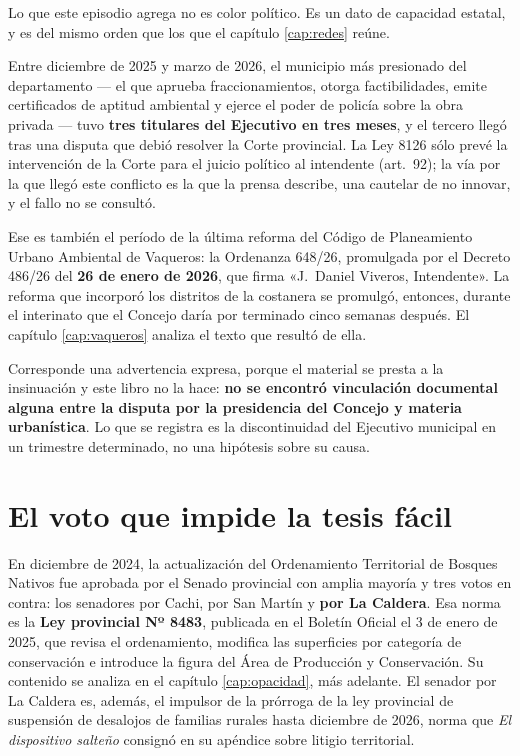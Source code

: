 \begin{cautela}
Lo que este episodio agrega no es color político. Es un dato de capacidad estatal, y es del mismo orden que los que el capítulo \ref{cap:redes} reúne.

Entre diciembre de 2025 y marzo de 2026, el municipio más presionado del departamento --- el que aprueba fraccionamientos, otorga factibilidades, emite certificados de aptitud ambiental y ejerce el poder de policía sobre la obra privada --- tuvo \textbf{tres titulares del Ejecutivo en tres meses}, y el tercero llegó tras una disputa que debió resolver la Corte provincial. La Ley 8126 sólo prevé la intervención de la Corte para el juicio político al intendente (art.\ 92); la vía por la que llegó este conflicto es la que la prensa describe, una cautelar de no innovar, y el fallo no se consultó.

Ese es también el período de la última reforma del Código de Planeamiento Urbano Ambiental de Vaqueros: la Ordenanza 648/26, promulgada por el Decreto 486/26 del \textbf{26 de enero de 2026}, que firma «J.\ Daniel Viveros, Intendente». La reforma que incorporó los distritos de la costanera se promulgó, entonces, durante el interinato que el Concejo daría por terminado cinco semanas después. El capítulo \ref{cap:vaqueros} analiza el texto que resultó de ella.

Corresponde una advertencia expresa, porque el material se presta a la insinuación y este libro no la hace: \textbf{no se encontró vinculación documental alguna entre la disputa por la presidencia del Concejo y materia urbanística}. Lo que se registra es la discontinuidad del Ejecutivo municipal en un trimestre determinado, no una hipótesis sobre su causa.
\end{cautela}


\section{El voto que impide la tesis fácil}

En diciembre de 2024, la actualización del Ordenamiento Territorial de Bosques Nativos fue aprobada por el Senado provincial con amplia mayoría y tres votos en contra: los senadores por Cachi, por San Martín y \textbf{por La Caldera}. Esa norma es la \textbf{Ley provincial Nº 8483}, publicada en el Boletín Oficial el 3 de enero de 2025, que revisa el ordenamiento, modifica las superficies por categoría de conservación e introduce la figura del Área de Producción y Conservación. Su contenido se analiza en el capítulo \ref{cap:opacidad}, más adelante. El senador por La Caldera es, además, el impulsor de la prórroga de la ley provincial de suspensión de desalojos de familias rurales hasta diciembre de 2026, norma que \textit{El dispositivo salteño} consignó en su apéndice sobre litigio territorial.

